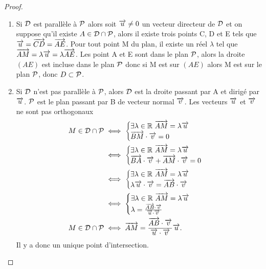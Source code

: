 \begin{proof}
  \begin{enumerate}
    \item Si \(\Dr\) est parallèle à \(\P\) alors soit \(\vu\neq 0\) un
      vecteur directeur de \(\Dr\) et on suppose qu'il existe
      \(A\in\Dr\cap\P\), alors il existe trois points C, D et E tels que \(\vu
      = \vect{CD} = \vect{AE}\).  Pour tout point M du plan, il existe un réel
      \(\lambda\) tel que \(\vect{AM} = \lambda\vu = \lambda\vect{AE}\). Les
      point A et E sont dans le plan \(\P\), alors la droite \((AE)\) est
      incluse dans le plan \(\P\) donc si M est sur \((AE)\) alors M est sur
      le plan \(\P\), donc \(D \subset \P\).
    \item Si \(\Dr\) n'est pas parallèle à \(\P\), alors \(\Dr\) est la droite
      passant par A et dirigé par \(\vu\). \(\P\) est le plan passant par B de
      vecteur normal \(\vv\). Les vecteurs \(\vu\) et \(\vv\) ne sont pas
      orthogonaux
      \begin{align}
        M \in \Dr\cap\P
        & \iff
        \begin{cases}
          \exists \lambda \in \R \ \vect{AM} = \lambda\vu \\
          \vect{BM}\cdot\vv = 0
        \end{cases} \\
        & \iff
        \begin{cases}
          \exists \lambda \in \R \ \vect{AM} = \lambda\vu \\
          \vect{BA}\cdot\vv + \vect{AM}\cdot\vv = 0
        \end{cases}\\
        & \iff
        \begin{cases}
          \exists \lambda \in \R \ \vect{AM} = \lambda\vu \\
          \lambda\vu\cdot\vv = \vect{AB}\cdot\vv
        \end{cases}\\
        & \iff
        \begin{cases}
          \exists \lambda \in \R \ \vect{AM} = \lambda\vu \\
          \lambda = \frac{\vect{AB}\cdot\vv}{\vu\cdot\vv}
        \end{cases}\\
        M \in \Dr\cap\P &\iff \vect{AM} =
        \frac{\vect{AB}\cdot\vv}{\vu\cdot\vv}\vu.
      \end{align}
      Il y a donc un unique point d'intersection.
  \end{enumerate}
\end{proof}

